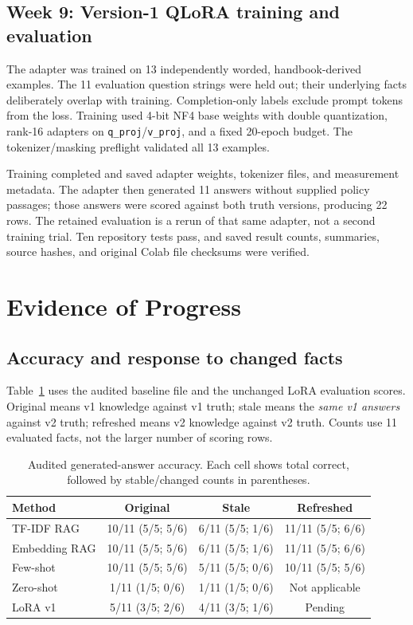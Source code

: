 \documentclass[10pt,letterpaper]{article}
\begin{document}
\subsection{Week 9: Version-1 QLoRA training and evaluation}
The adapter was trained on 13 independently worded, handbook-derived examples. The 11 evaluation question strings were held out; their underlying facts deliberately overlap with training. Completion-only labels exclude prompt tokens from the loss. Training used 4-bit NF4 base weights with double quantization, rank-16 adapters on \texttt{q\_proj}/\texttt{v\_proj}, and a fixed 20-epoch budget. The tokenizer/masking preflight validated all 13 examples.

Training completed and saved adapter weights, tokenizer files, and measurement metadata. The adapter then generated 11 answers without supplied policy passages; those answers were scored against both truth versions, producing 22 rows. The retained evaluation is a rerun of that same adapter, not a second training trial. Ten repository tests pass, and saved result counts, summaries, source hashes, and original Colab file checksums were verified.

\clearpage
\section{Evidence of Progress}
\subsection{Accuracy and response to changed facts}
Table~\ref{tab:accuracy} uses the audited baseline file and the unchanged LoRA evaluation scores. Original means v1 knowledge against v1 truth; stale means the \emph{same v1 answers} against v2 truth; refreshed means v2 knowledge against v2 truth. Counts use 11 evaluated facts, not the larger number of scoring rows.

\begin{table}[htbp]\centering\small
\caption{Audited generated-answer accuracy. Each cell shows total correct, followed by stable/changed counts in parentheses.}\label{tab:accuracy}
\begin{tabular}{lccc}\toprule
Method & Original & Stale & Refreshed\\\midrule
TF-IDF RAG & 10/11 (5/5; 5/6) & 6/11 (5/5; 1/6) & 11/11 (5/5; 6/6)\\
Embedding RAG & 10/11 (5/5; 5/6) & 6/11 (5/5; 1/6) & 11/11 (5/5; 6/6)\\
Few-shot & 10/11 (5/5; 5/6) & 5/11 (5/5; 0/6) & 10/11 (5/5; 5/6)\\
Zero-shot & 1/11 (1/5; 0/6) & 1/11 (1/5; 0/6) & Not applicable\\
LoRA v1 & 5/11 (3/5; 2/6) & 4/11 (3/5; 1/6) & Pending\\\bottomrule
\end{tabular}
\end{table}
\end{document}
